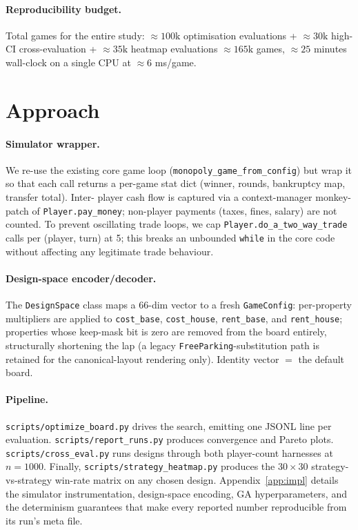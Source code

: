 \documentclass[10pt]{article}
\begin{document}
\paragraph{Reproducibility budget.} Total games for the entire study:
$\approx 100\text{k}$ optimisation evaluations + $\approx 30\text{k}$
high-CI cross-evaluation + $\approx 35\text{k}$ heatmap evaluations
$\approx 165\text{k}$ games, $\approx 25$ minutes wall-clock on a single
CPU at $\approx 6$ ms/game.

\section{Approach}

\paragraph{Simulator wrapper.} We re-use the existing core game loop
(\texttt{monopoly\_game\_from\_config}) but wrap it so that each call returns
a per-game stat dict (winner, rounds, bankruptcy map, transfer total). Inter-
player cash flow is captured via a context-manager monkey-patch of
\texttt{Player.pay\_money}; non-player payments (taxes, fines, salary) are
not counted. To prevent oscillating trade loops, we cap
\texttt{Player.do\_a\_two\_way\_trade} calls per (player, turn) at 5; this
breaks an unbounded \texttt{while} in the core code without affecting any
legitimate trade behaviour.

\paragraph{Design-space encoder/decoder.} The \texttt{DesignSpace} class
maps a 66-dim vector to a fresh \texttt{GameConfig}: per-property
multipliers are applied to \texttt{cost\_base},
\texttt{cost\_house}, \texttt{rent\_base}, and \texttt{rent\_house};
properties whose keep-mask bit is zero are removed from the board
entirely, structurally shortening the lap (a legacy
\texttt{FreeParking}-substitution path is retained for the
canonical-layout rendering only). Identity vector $=$ the default board.

\paragraph{Pipeline.} \texttt{scripts/optimize\_board.py} drives the search,
emitting one JSONL line per evaluation. \texttt{scripts/report\_runs.py}
produces convergence and Pareto plots. \texttt{scripts/cross\_eval.py} runs
designs through both player-count harnesses at $n{=}1000$. Finally,
\texttt{scripts/strategy\_heatmap.py} produces the $30{\times}30$
strategy-vs-strategy win-rate matrix on any chosen design.
Appendix~\ref{app:impl} details the simulator instrumentation,
design-space encoding, GA hyperparameters, and the determinism guarantees
that make every reported number reproducible from its run's meta file.
\end{document}
